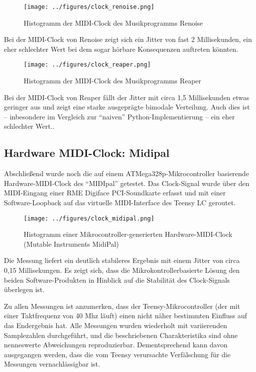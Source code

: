 \begin{figure}[H]
	\centering
	\captionsetup{justification=centering,margin=2cm}
		\texttt{[image: ../figures/clock\_renoise.png]}
		\caption[Histogramm der MIDI-Clock des Musikprogramms Renoise]{Histogramm der MIDI-Clock des Musikprogramms Renoise}
	\label{fig:ice40_pmod_pins}
\end{figure}

Bei der MIDI-Clock von Renoise zeigt sich ein Jitter von fast 2 Millisekunden, ein eher schlechter Wert bei dem sogar hörbare Konsequenzen auftreten könnten.

\begin{figure}[H]
	\centering
	\captionsetup{justification=centering,margin=2cm}
		\texttt{[image: ../figures/clock\_reaper.png]}
		\caption[Histogramm der MIDI-Clock des Musikprogramms Reaper]{Histogramm der MIDI-Clock des Musikprogramms Reaper}
	\label{fig:ice40_pmod_pins}
\end{figure}

Bei der MIDI-Clock von Reaper fällt der Jitter mit circa 1,5 Millisekunden etwas geringer aus und zeigt eine starke ausgeprägte bimodale Verteilung. Auch dies ist -- inbesondere im Vergleich zur ``naiven'' Python-Implementierung -- ein eher schlechter Wert..

\subsection{Hardware MIDI-Clock: Midipal}
Abschließend wurde noch die auf einem ATMega328p-Mikrocontroller basierende Hardware-MIDI-Clock des ``MIDIpal'' getestet. Das Clock-Signal wurde über den MIDI-Eingang einer RME Digiface PCI-Soundkarte erfasst und mit einer Software-Loopback auf das virtuelle MIDI-Interface des Teensy LC geroutet.

\begin{figure}[H]
	\centering
	\captionsetup{justification=centering,margin=2cm}
		\texttt{[image: ../figures/clock\_midipal.png]}
		\caption[Histogramm einer Mikrocontroller-generierten Hardware-MIDI-Clock]{Histogramm einer Mikrocontroller-generierten Hardware-MIDI-Clock (Mutable Instruments MidiPal)}
	\label{fig:ice40_pmod_pins}
\end{figure}

Die Messung liefert ein deutlich stabileres Ergebnis mit einem Jitter von circa 0,15 Millisekungen. Es zeigt sich, dass die Mikrokontrollerbasierte Lösung den beiden Software-Produkten in Hinblick auf die Stabilität des Clock-Signals überlegen ist.

Zu allen Messungen ist anzumerken, dass der Teensy-Mikrocontroller (der mit einer Taktfrequenz von 40 Mhz läuft) einen nicht näher bestimmten Einfluss auf das Endergebnis hat. Alle Messungen wurden wiederholt mit variierenden Samplezahlen durchgeführt, und die beschriebenen Charakteristika sind ohne nenneswerte Abweichungen reproduzierbar. Dementsprechend kann davon ausgegangen werden, dass die vom Teensy verursachte Verfälschung für die Messungen vernachlässigbar ist.



